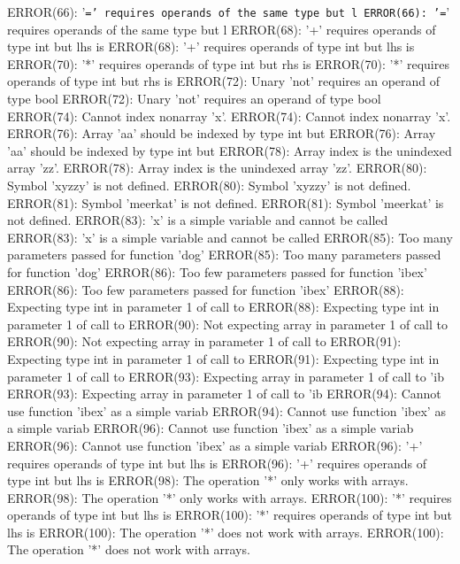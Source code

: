 \documentclass[12pt]{book}
\begin{document}
ERROR(66): '\texttt{=' requires operands of the same type but l	ERROR(66): '=}' requires operands of the same type but l
ERROR(68): '+' requires operands of type int but lhs is         ERROR(68): '+' requires operands of type int but lhs is 
ERROR(70): '*' requires operands of type int but rhs is         ERROR(70): '*' requires operands of type int but rhs is 
ERROR(72): Unary 'not' requires an operand of type bool         ERROR(72): Unary 'not' requires an operand of type bool 
ERROR(74): Cannot index nonarray 'x'.                                ERROR(74): Cannot index nonarray 'x'.
ERROR(76): Array 'aa' should be indexed by type int but         ERROR(76): Array 'aa' should be indexed by type int but 
ERROR(78): Array index is the unindexed array 'zz'.                ERROR(78): Array index is the unindexed array 'zz'.
ERROR(80): Symbol 'xyzzy' is not defined.                        ERROR(80): Symbol 'xyzzy' is not defined.
ERROR(81): Symbol 'meerkat' is not defined.                        ERROR(81): Symbol 'meerkat' is not defined.
ERROR(83): 'x' is a simple variable and cannot be called        ERROR(83): 'x' is a simple variable and cannot be called
ERROR(85): Too many parameters passed for function 'dog'        ERROR(85): Too many parameters passed for function 'dog'
ERROR(86): Too few parameters passed for function 'ibex'        ERROR(86): Too few parameters passed for function 'ibex'
ERROR(88): Expecting type int in parameter 1 of call to         ERROR(88): Expecting type int in parameter 1 of call to 
ERROR(90): Not expecting array in parameter 1 of call to        ERROR(90): Not expecting array in parameter 1 of call to
ERROR(91): Expecting type int in parameter 1 of call to         ERROR(91): Expecting type int in parameter 1 of call to 
ERROR(93): Expecting array in parameter 1 of call to 'ib        ERROR(93): Expecting array in parameter 1 of call to 'ib
ERROR(94): Cannot use function 'ibex' as a simple variab        ERROR(94): Cannot use function 'ibex' as a simple variab
ERROR(96): Cannot use function 'ibex' as a simple variab        ERROR(96): Cannot use function 'ibex' as a simple variab
ERROR(96): '+' requires operands of type int but lhs is         ERROR(96): '+' requires operands of type int but lhs is 
ERROR(98): The operation '*' only works with arrays.                ERROR(98): The operation '*' only works with arrays.
ERROR(100): '*' requires operands of type int but lhs is        ERROR(100): '*' requires operands of type int but lhs is
ERROR(100): The operation '*' does not work with arrays.        ERROR(100): The operation '*' does not work with arrays.
\end{document}
